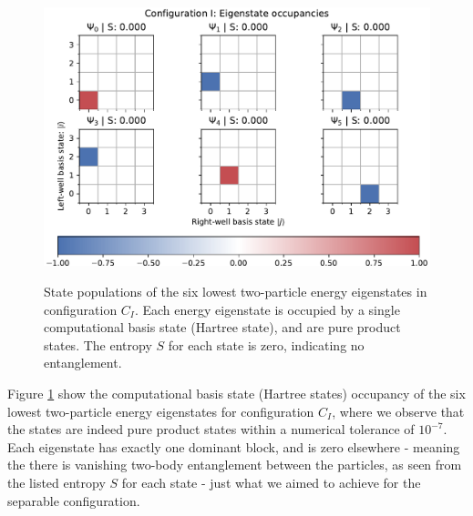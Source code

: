 \documentclass{subfiles}
\begin{document}
\begin{figure}[h!]
  \centering
  \includegraphics[width=\textwidth]{figs/state_populations_I.pdf}
  \label{fig:populations_I}
  \caption{State populations of the six lowest two-particle energy eigenstates in configuration $C_I$. Each energy eigenstate is occupied by a single computational basis state (Hartree state), and are pure product states. The entropy $S$ for each state is zero, indicating no entanglement.}
\end{figure}
Figure \ref{fig:populations_I} show the computational basis state (Hartree states) occupancy of the six lowest two-particle energy eigenstates for configuration $C_I$, where we observe that the states are indeed pure product states within a numerical tolerance of $10^{-7}$. Each eigenstate has exactly one dominant block, and is zero elsewhere - meaning the there is vanishing two-body entanglement between the particles, as seen from the listed entropy $S$ for each state - just what we aimed to achieve for the separable configuration. 
\\
\end{document}
